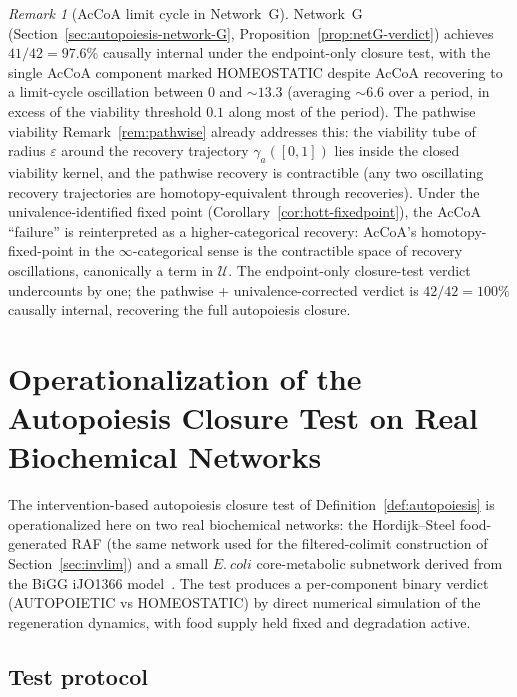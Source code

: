 \documentclass[11pt,a4paper]{article}
\theoremstyle{plain}
\theoremstyle{definition}
\theoremstyle{remark}
\newtheorem{remark}[theorem]{Remark}
\begin{document}
\begin{remark}[AcCoA limit cycle in Network~G]
\label{rem:netG-accola-cycle}
Network~G (Section~\ref{sec:autopoiesis-network-G},
Proposition~\ref{prop:netG-verdict}) achieves $41/42 = 97.6\%$
causally internal under the endpoint-only closure test, with the single
AcCoA component marked HOMEOSTATIC despite AcCoA recovering to a
limit-cycle oscillation between $0$ and $\sim 13.3$ (averaging $\sim
6.6$ over a period, in excess of the viability threshold $0.1$ along
most of the period). The pathwise viability Remark~\ref{rem:pathwise}
already addresses this: the viability tube of radius $\varepsilon$
around the recovery trajectory $\gamma_a([0,1])$ lies inside the closed
viability kernel, and the pathwise recovery is contractible (any two
oscillating recovery trajectories are homotopy-equivalent through
recoveries). Under the univalence-identified fixed point
(Corollary~\ref{cor:hott-fixedpoint}), the AcCoA ``failure'' is
reinterpreted as a higher-categorical recovery: AcCoA's
homotopy-fixed-point in the $\infty$-categorical sense is the
contractible space of recovery oscillations, canonically a term in
$\mathcal{U}$. The endpoint-only closure-test verdict undercounts by
one; the pathwise + univalence-corrected verdict is $42/42 = 100\%$
causally internal, recovering the full autopoiesis closure.
\end{remark}

\section{Operationalization of the Autopoiesis Closure Test on Real Biochemical Networks}\label{sec:autopoiesis-real-networks}

The intervention-based autopoiesis closure test of
Definition~\ref{def:autopoiesis} is operationalized here on two real
biochemical networks: the Hordijk--Steel food-generated RAF (the same
network used for the filtered-colimit construction of
Section~\ref{sec:invlim}) and a small $E.~coli$ core-metabolic
subnetwork derived from the BiGG iJO1366 model~\cite{orth2011}. The
test produces a per-component binary verdict (AUTOPOIETIC vs
HOMEOSTATIC) by direct numerical simulation of the regeneration
dynamics, with food supply held fixed and degradation active.

\subsection{Test protocol}
\end{document}
